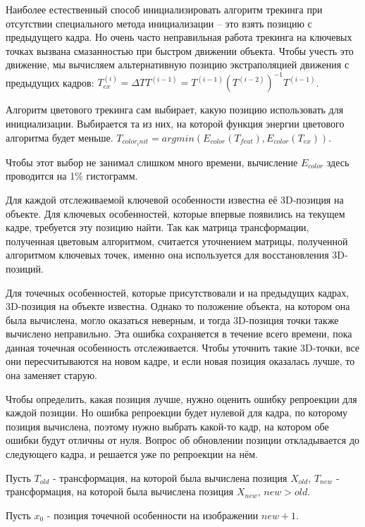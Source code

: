 Наиболее естественный способ инициализировать алгоритм трекинга при отсутствии специального метода инициализации -- это взять позицию с предыдущего кадра. Но очень часто неправильная работа трекинга на ключевых точках вызвана смазанностью при быстром движении объекта. Чтобы учесть это движение, мы вычисляем альтернативную позицию экстраполяцией движения с предыдущих кадров: $T^{(i)}_{ex} = \Delta T T^{(i - 1)} = T^{(i - 1)}(T^{(i - 2)})^{-1} T^{(i - 1)}$.

Алгоритм цветового трекинга сам выбирает, какую позицию использовать для инициализации. Выбирается та из них, на которой функция энергии цветового алгоритма будет меньше. $T_{color_init} = argmin(E_{color}(T_{feat}), E_{color}(T_{ex}))$.

Чтобы этот выбор не занимал слишком много времени, вычисление $E_{color}$ здесь проводится на 1\% гистограмм.

Для каждой отслеживаемой ключевой особенности известна её 3D-позиция на объекте. Для ключевых особенностей, которые впервые появились на текущем кадре, требуется эту позицию найти. Так как матрица трансформации, полученная цветовым алгоритмом, считается уточнением матрицы, полученной алгоритмом ключевых точек, именно она используется для восстановления 3D-позиций.


Для точечных особенностей, которые присутствовали и на предыдущих кадрах, 3D-позиция на объекте известна. Однако то положение объекта, на котором она была вычислена, могло оказаться неверным, и тогда 3D-позиция точки также вычислено неправильно. Эта ошибка сохраняется в течение всего времени, пока данная точечная особенность отслеживается. Чтобы уточнить такие 3D-точки, все они пересчитываются на новом кадре, и если новая позиция оказалась лучше, то она заменяет старую.

Чтобы определить, какая позиция лучше, нужно оценить ошибку репроекции для каждой позиции. Но ошибка репроекции будет нулевой для кадра, по которому позиция вычислена, поэтому нужно выбрать какой-то кадр, на котором обе ошибки будут отличны от нуля. Вопрос об обновлении позиции откладывается до следующего кадра, и решается уже по репроекции на нём. 

Пусть $T_{old}$ - трансформация, на которой была вычислена позиция $X_{old}$, $T_{new}$ - трансформация, на которой была вычислена позиция $X_{new}$, $new > old$.

Пусть $x_0$ - позиция точечной особенности на изображении $new + 1$. 

